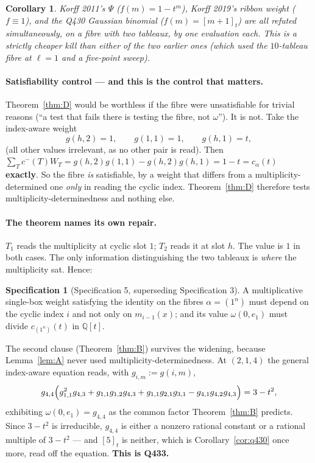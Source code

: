 \documentclass[11pt]{article}
\theoremstyle{plain}
\newtheorem{corollary}[theorem]{Corollary}
\theoremstyle{definition}
\newtheorem{specification}[theorem]{Specification}
\theoremstyle{remark}
\newcommand{\cm}{c^{-}}
\newcommand{\qbin}[1]{[#1]_t}
\begin{document}
\begin{corollary}
Korff 2011's $\Psi$ ($f(m)=1-t^m$), Korff 2019's ribbon weight ($f\equiv1$), and the Q430
Gaussian binomial ($f(m)=\qbin{m+1}$) are all refuted simultaneously, on a fibre with two
tableaux, by one evaluation each. This is a strictly cheaper kill than either of the two
earlier ones (which used the $10$-tableau fibre at $\ell=1$ and a five-point sweep).
\end{corollary}

\paragraph{Satisfiability control --- and this is the control that matters.}
Theorem~\ref{thm:D} would be worthless if the fibre were unsatisfiable for trivial reasons
(``a test that fails there is testing the fibre, not $\omega$''). It is not. Take the
index-aware weight
\[
g(h,2)=1,\qquad g(1,1)=1,\qquad g(h,1)=t,
\]
(all other values irrelevant, as no other pair is read). Then
$\sum_T\cm(T)W_T = g(h,2)g(1,1)-g(h,2)g(h,1)=1-t=c_\alpha(t)$ \textbf{exactly}. So the
fibre \emph{is} satisfiable, by a weight that differs from a multiplicity-determined one
\emph{only} in reading the cyclic index. Theorem~\ref{thm:D} therefore tests
multiplicity-determinedness and nothing else.

\paragraph{The theorem names its own repair.}
$T_1$ reads the multiplicity at cyclic slot $1$; $T_2$ reads it at slot $h$. The value is
$1$ in both cases. The only information distinguishing the two tableaux is \emph{where} the
multiplicity sat. Hence:
\begin{specification}[Specification 5, superseding Specification 3]\label{spec5}
A multiplicative single-box weight satisfying the identity on the fibres $\alpha=(1^n)$
must depend on the cyclic index $i$ and not only on $m_{i-1}(x)$; and its value
$\omega(0,e_1)$ must divide $c_{(1^n)}(t)$ in $\mathbb{Q}[t]$.
\end{specification}
\noindent The second clause (Theorem~\ref{thm:B}) survives the widening, because
Lemma~\ref{lem:A} never used multiplicity-determinedness. At $(2,1,4)$ the general
index-aware equation reads, with $g_{i,m}:=g(i,m)$,
\[
g_{4,4}\Bigl(g_{1,1}^2g_{4,3}+g_{1,1}g_{1,2}g_{4,3}+g_{1,1}g_{2,1}g_{3,1}-g_{4,1}g_{4,2}g_{4,3}\Bigr)=3-t^2,
\]
exhibiting $\omega(0,e_1)=g_{4,4}$ as the common factor Theorem~\ref{thm:B} predicts. Since
$3-t^2$ is irreducible, $g_{4,4}$ is either a nonzero rational constant or a rational
multiple of $3-t^2$ --- and $\qbin5$ is neither, which is
Corollary~\ref{cor:q430} once more, read off the equation. \textbf{This is Q433.}
\end{document}
